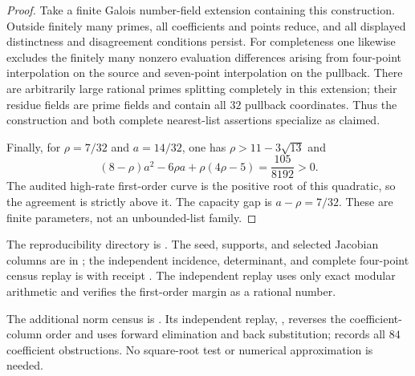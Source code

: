 \begin{proof}
Take a finite Galois number-field extension containing this construction.
Outside finitely many primes, all coefficients and points reduce, and
all displayed distinctness and disagreement conditions persist.
For completeness one likewise excludes the finitely many nonzero
evaluation differences arising from four-point interpolation on the
source and seven-point interpolation on the pullback.
There are arbitrarily large rational primes splitting completely in
this extension; their residue fields are prime fields and contain all
$32$ pullback coordinates. Thus the construction and both complete nearest-list assertions
specialize as claimed.

Finally, for $\rho=7/32$ and $a=14/32$, one has
$\rho>11-3\sqrt{13}$ and
\[
 (8-\rho)a^2-6\rho a+\rho(4\rho-5)=\frac{105}{8192}>0.
\]
The audited high-rate first-order curve is the positive root of this
quadratic, so the agreement is strictly above it. The capacity gap is
$a-\rho=7/32$. These are finite parameters, not an unbounded-list family.
\end{proof}

The reproducibility directory is
.
The seed, supports, and selected Jacobian columns are in
; the independent incidence, determinant, and
complete four-point census replay is
 with receipt
. The independent replay uses only exact
modular arithmetic and verifies the first-order margin as a rational
number.

The additional norm census is .
Its independent replay, , reverses the
coefficient-column order and uses forward elimination and back substitution;
 records all $84$ coefficient
obstructions. No square-root test or numerical approximation is needed.
